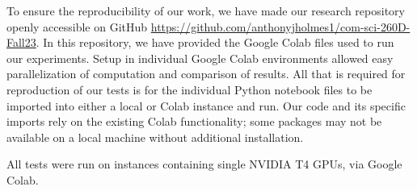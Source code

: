 To ensure the reproducibility of our work, we have made our research repository openly accessible on GitHub \url{https://github.com/anthonyjholmes1/com-sci-260D-Fall23}. In this repository, we have provided the Google Colab files used to run our experiments. Setup in individual Google Colab environments allowed easy parallelization of computation and comparison of results. All that is required for reproduction of our tests is for the individual Python notebook files to be imported into either a local or Colab instance and run. Our code and its specific imports rely on the existing Colab functionality; some packages may not be available on a local machine without additional installation.

All tests were run on instances containing single NVIDIA T4 GPUs, via Google Colab.